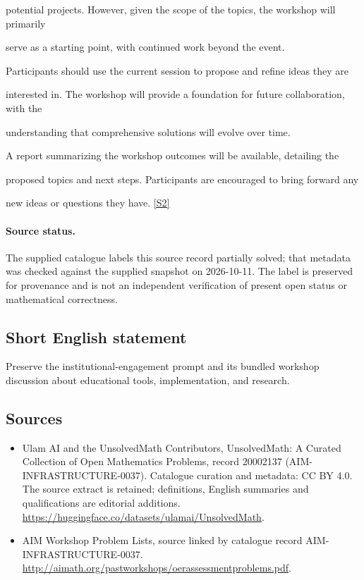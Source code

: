 \documentclass[11pt]{article}
\newcommand{\sref}[2]{\hyperlink{source:#1:#2}{[S#2]}}
\begin{document}
potential projects. However, given the scope of the topics, the workshop will primarily

serve as a starting point, with continued work beyond the event.

Participants should use the current session to propose and refine ideas they are

interested in. The workshop will provide a foundation for future collaboration, with the

understanding that comprehensive solutions will evolve over time.

A report summarizing the workshop outcomes will be available, detailing the

proposed topics and next steps. Participants are encouraged to bring forward any

new ideas or questions they have. \sref{20002137}{2}
\paragraph{Source status.}
The supplied catalogue labels this source record partially solved; that metadata was checked against the supplied snapshot on 2026-10-11. The label is preserved for provenance and is not an independent verification of present open status or mathematical correctness.
\subsection{Short English statement}
Preserve the institutional-engagement prompt and its bundled workshop discussion about educational tools, implementation, and research.
\subsection{Sources}
\begin{itemize}
\item[\hypertarget{source:20002137:1}{S1}] Ulam AI and the UnsolvedMath Contributors, UnsolvedMath: A Curated Collection of Open Mathematics Problems, record 20002137 (AIM-INFRASTRUCTURE-0037). Catalogue curation and metadata: CC BY 4.0. The source extract is retained; definitions, English summaries and qualifications are editorial additions.
\url{https://huggingface.co/datasets/ulamai/UnsolvedMath}.
\item[\hypertarget{source:20002137:2}{S2}] AIM Workshop Problem Lists, source linked by catalogue record AIM-INFRASTRUCTURE-0037.
\url{http://aimath.org/pastworkshops/oerassessmentproblems.pdf}.
\end{itemize}
\end{document}
